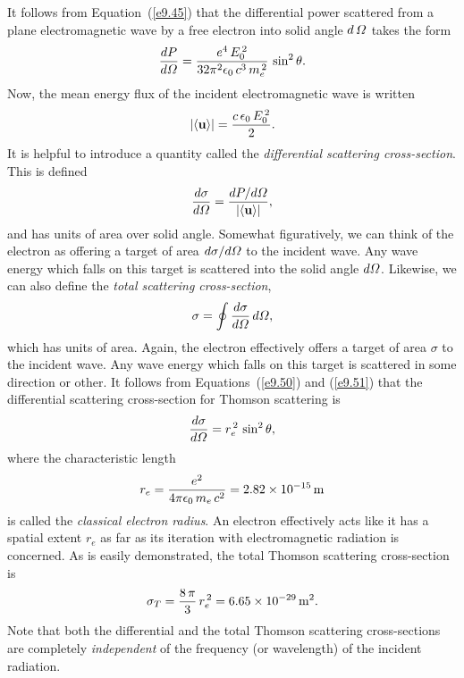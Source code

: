 It follows from Equation~(\ref{e9.45}) that the differential power scattered
from a plane electromagnetic wave
by a free electron into solid angle $d\,{\mit\Omega}$ takes the form
\begin{equation}\label{e9.50}
\frac{dP}{d{\mit\Omega}} = \frac{e^4\,E_0^{\,2}}{32\pi^2\epsilon_0\,c^3\,m_e^{\,2}}\,\sin^2\theta.
\end{equation}
Now, the mean energy flux of the incident  electromagnetic wave is written
\begin{equation}\label{e9.51}
|\langle {\bf u}\rangle| = \frac{c\,\epsilon_0\,E_0^{\,2}}{2}.
\end{equation}
It is helpful to introduce  a quantity called the {\em differential scattering cross-section}. This is defined
\begin{equation}
\frac{d\sigma}{d{\mit\Omega}} = \frac{dP/d{\mit\Omega}}{|\langle{\bf u}\rangle|},
\end{equation}
and has units of area over solid angle. Somewhat figuratively, we can think
of the electron as offering a target of area $d\sigma/d{\mit\Omega}$ to the
incident wave. Any wave energy which falls on this target is scattered into
the solid angle $d{\mit\Omega}$. Likewise, we can also define the {\em total scattering cross-section},
\begin{equation}
\sigma = \oint \frac{d\sigma}{d{\mit\Omega}}\,d{\mit\Omega},
\end{equation}
which has units of area. Again, the electron effectively offers a target of
area $\sigma$ to the incident wave. Any wave energy which falls on this
target is scattered in some direction or other.
It follows from Equations~(\ref{e9.50}) and (\ref{e9.51}) that the differential
scattering cross-section for Thomson scattering is
\begin{equation}
\frac{d\sigma}{d{\mit\Omega}} = r_e^{\,2}\,\sin^2\theta,
\end{equation}
where the characteristic length
\begin{equation}\label{e9.55}
r_e = \frac{e^2}{4\pi\epsilon_0\,m_e\,c^2} = 2.82\times 10^{-15}\,{\rm m}
\end{equation}
is called the {\em classical electron radius}. An electron effectively acts
like it has a spatial extent $r_e$ as far as its iteration with  electromagnetic
radiation is concerned. As is easily demonstrated, the
total Thomson scattering cross-section is
\begin{equation}\label{e9.56}
\sigma_T = \frac{8\,\pi}{3}\,r_e^{\,2} = 6.65\times 10^{-29}\,{\rm m^2}.
\end{equation}
Note that both the differential and the total Thomson scattering cross-sections
are completely {\em independent}\/ of the frequency (or wavelength) of the incident
radiation.

